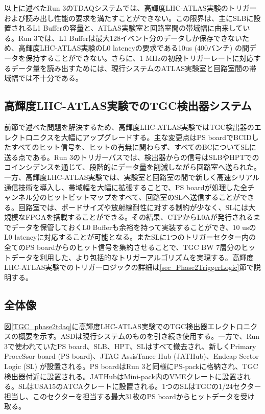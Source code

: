 以上に述べたRun 3のTDAQシステムでは、高輝度LHC-ATLAS実験のトリガーおよび読み出し性能の要求を満たすことができない。この限界は、主にSLBに設置されるL1 Bufferの容量と、ATLAS実験室と回路室間の帯域幅に由来している。Run 3では、L1 Bufferは最大128イベント分のデータしか保存できないため、高輝度LHC-ATLAS実験のL0 latencyの要求である10us (400バンチ) の間データを保持することができない。さらに、1 MHzの初段トリガーレートに対応するデータ量を読み出すためには、現行システムのATLAS実験室と回路室間の帯域幅では不十分である。

    \subsection{高輝度LHC-ATLAS実験でのTGC検出器システム}  
前節で述べた問題を解決するため、高輝度LHC-ATLAS実験ではTGC検出器のエレクトロニクスを大幅にアップグレードする。主な変更点はPS boardでBCIDしたすべてのヒット信号を、ヒットの有無に関わらず、すべてのBCについてSLに送る点である。Run 3のトリガーパスでは、検出器からの信号はSLBやHPTでのコインシデンスを通じて、段階的にデータ量を削減しながら回路室へ送られた。一方、高輝度LHC-ATLAS実験では、実験室と回路室の間で新しく高速シリアル通信技術を導入し、帯域幅を大幅に拡張することで、PS boardが処理した全チャンネル分のヒットビットマップをすべて、回路室のSLへ送信することができる。回路室では、ボードサイズや放射線耐性に対する制約が少なく、SLには大規模なFPGAを搭載することができる。その結果、CTPからL0Aが発行されるまでデータを保管しておくL0 Bufferも余裕を持って実装することができ、10 usのL0 latencyに対応することが可能となる。またSLに1つのトリガーセクター内の全てのPS boardからのヒット信号を集約させることで、TGC BW 7層分のヒットデータを利用した、より包括的なトリガーアルゴリズムを実現する。高輝度LHC-ATLAS実験でのトリガーロジックの詳細は\ref{sec_Phase2TriggerLogic}節で説明する。

\subsection*{全体像}
図\ref{TGC_phase2tdaq}に高輝度LHC-ATLAS実験でのTGC検出器エレクトロニクスの概要を示す。ASDは現行システムのものを引き続き使用する。一方で、Run 3で使われていたPS board、SLB、HPT、SLはすべて撤去され、新しくPrimary ProceSsor board  (PS board)、JTAG AssisTance Hub  (JATHub)、Endcap Sector Logic  (SL) が設置される。PS boardはRun 3と同様にPS-packに格納され、TGC検出器付近に設置される。JATHubはMini-pack内のVMEクレートに設置される。SLはUSA15のATCAクレートに設置される。1つのSLはTGCの1/24セクター担当し、このセクターを担当する最大31枚のPS boardからヒットデータを受け取る。


